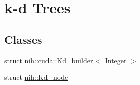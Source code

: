\hypertarget{group__kdtree}{
\section{k-\/d \-Trees}
\label{group__kdtree}
}
\subsection*{\-Classes}
\begin{DoxyCompactItemize}
\item 
struct \hyperlink{structnih_1_1cuda_1_1_kd__builder}{nih\-::cuda\-::\-Kd\-\_\-builder$<$ Integer $>$}
\item 
struct \hyperlink{structnih_1_1_kd__node}{nih\-::\-Kd\-\_\-node}
\end{DoxyCompactItemize}
